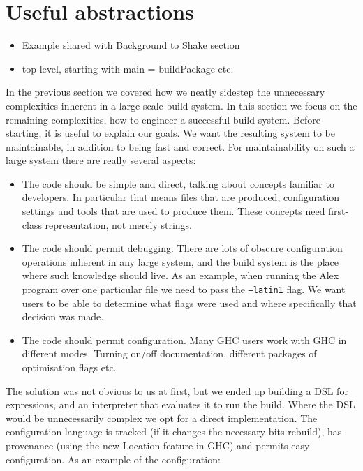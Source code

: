 \section{Useful abstractions\label{sec:abstractions}}



\begin{itemize}
  \item Example shared with Background to Shake section
  \item top-level, starting with main = buildPackage etc.
\end{itemize}

In the previous section we covered how we neatly sidestep the unnecessary
complexities inherent in a large scale build system. In this section we focus on
the remaining complexities, how to engineer a successful build system. Before
starting, it is useful to explain our goals. We want the resulting system to be
maintainable, in addition to being fast and correct. For maintainability on such
a large system there are really several aspects:

\begin{itemize}
\item The code should be simple and direct, talking about concepts familiar to developers. In particular that means files that are produced, configuration settings and tools that are used to produce them. These concepts need first-class representation, not merely strings.
\item The code should permit debugging. There are lots of obscure configuration operations inherent in any large system, and the build system is the place where such knowledge should live. As an example, when running the Alex program over one particular file we need to pass the \texttt{--latin1} flag. We want users to be able to determine what flags were used and where specifically that decision was made.
\item The code should permit configuration. Many GHC users work with GHC in different modes. Turning on/off documentation, different packages of optimisation flags etc.
\end{itemize}

The solution was not obvious to us at first, but we ended up building a DSL for expressions, and an interpreter that evaluates it to run the build. Where the DSL would be unnecessarily complex we opt for a direct implementation. The configuration language is tracked (if it changes the necessary bits rebuild), has provenance (using the new Location feature in GHC) and permits easy configuration. As an example of the configuration:

